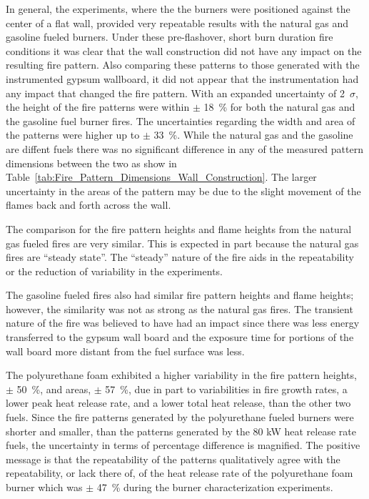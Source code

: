 \documentclass[twoside]{uocthesis}
\begin{document}
{In general, the experiments, where the the burners were positioned against the center of a flat wall, provided very repeatable results with the natural gas and gasoline fueled burners. Under these pre-flashover, short burn duration fire conditions it was clear that the wall construction did not have any impact on the resulting fire pattern.  Also comparing these patterns to those generated with the instrumented gypsum wallboard, it did not appear that the instrumentation had any impact that changed the fire pattern.  With an expanded uncertainty of 2~$\sigma$, the height of the fire patterns were within $\pm$ 18~\% for both the natural gas and the gasoline fuel burner fires.  The uncertainties regarding the width and area of the patterns were higher up to $\pm$ 33~\%.  While the natural gas and the gasoline are diffent fuels there was no significant difference in any of the measured pattern dimensions between the two as show in Table~\ref{tab:Fire_Pattern_Dimensions_Wall_Construction}.  The larger uncertainty in the areas of the pattern may be due to the slight movement of the flames back and forth across the wall.    

The comparison for the fire pattern heights and flame heights from the natural gas fueled fires are very similar.  This is expected in part because the natural gas fires are “steady state”.  The “steady” nature of the fire aids in the repeatability or the reduction of variability in the experiments.  

The gasoline fueled fires also had similar fire pattern heights and flame heights; however, the similarity was not as strong as the natural gas fires.  The transient nature of the fire was believed to have had an impact since there was less energy transferred to the gypsum wall board and the exposure time for portions of the wall board more distant from the fuel surface was less.  

The polyurethane foam exhibited a higher variability in the fire pattern heights, $\pm$ 50~\%, and areas, $\pm$ 57~\%, due in part to variabilities in fire growth rates, a lower peak heat release rate, and a lower total heat release, than the other two fuels. Since the fire patterns generated by the polyurethane fueled burners were shorter and smaller, than the patterns generated by the 80 kW heat release rate fuels, the uncertainty in terms of percentage difference is magnified.  The positive message is that the repeatability of the patterns qualitatively agree with the repeatability, or lack there of, of the heat release rate of the polyurethane foam burner which was $\pm$ 47~\% during the burner characterization experiments.     

}
\end{document}
